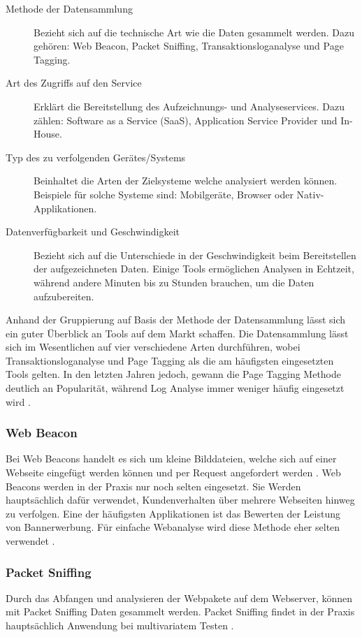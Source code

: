\begin{description}
  \item[Methode der Datensammlung] Bezieht sich auf die technische Art wie die Daten gesammelt werden. Dazu gehören: Web Beacon, Packet Sniffing, Transaktionsloganalyse und Page Tagging.  
  \item[Art des Zugriffs auf den Service] Erklärt die Bereitstellung des Aufzeichnungs- und Analyseservices. Dazu zählen: Software as a Service (SaaS), Application Service Provider und In-House.
  \item[Typ des zu verfolgenden Gerätes/Systems] Beinhaltet die Arten der Zielsysteme welche analysiert werden können. Beispiele für solche Systeme sind: Mobilgeräte, Browser oder Nativ-Applikationen.
  \item[Datenverfügbarkeit und Geschwindigkeit] Bezieht sich auf die Unterschiede in der Geschwindigkeit beim Bereitstellen der aufgezeichneten Daten. Einige Tools ermöglichen Analysen in Echtzeit, während andere Minuten bis zu Stunden brauchen, um die Daten aufzubereiten.
\end{description}

Anhand der Gruppierung auf Basis der Methode der Datensammlung lässt sich ein guter Überblick an Tools auf dem Markt schaffen. Die Datensammlung lässt sich im Wesentlichen auf vier verschiedene Arten durchführen, wobei Transaktionsloganalyse und Page Tagging als die am häufigsten eingesetzten Tools gelten. In den letzten Jahren jedoch, gewann die Page Tagging Methode deutlich an Popularität, während Log Analyse immer weniger häufig eingesetzt wird \parencite{nakatani2011toolselectionmethod}.

\subsubsection{Web Beacon} 
Bei Web Beacons handelt es sich um kleine Bilddateien, welche sich auf einer Webseite eingefügt werden können und per Request angefordert werden \parencite[S. 173]{nakatani2011toolselectionmethod}. Web Beacons werden in der Praxis nur noch selten eingesetzt. Sie Werden hauptsächlich dafür verwendet, Kundenverhalten über mehrere Webseiten hinweg zu verfolgen. Eine der häufigsten Applikationen ist das Bewerten der Leistung von Bannerwerbung. Für einfache Webanalyse wird diese Methode eher selten verwendet \parencite[S. 3]{waisberg2009webShort}.

\subsubsection{Packet Sniffing}
Durch das Abfangen und analysieren der Webpakete auf dem Webserver, können mit Packet Sniffing Daten gesammelt werden. Packet Sniffing findet in der Praxis hauptsächlich Anwendung bei multivariatem Testen \parencite[S. 4]{waisberg2009webShort}.

